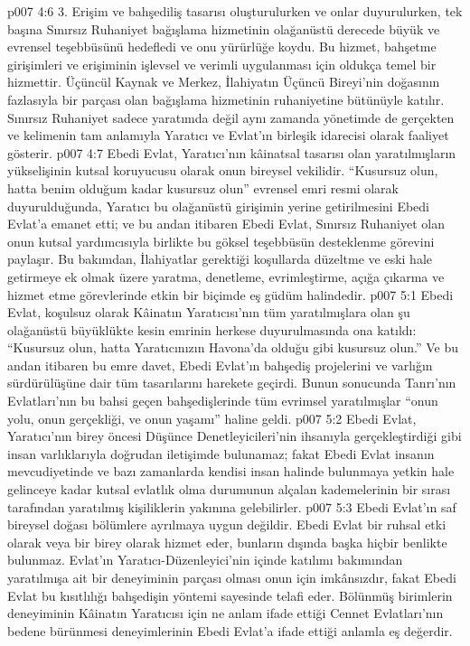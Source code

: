 \vs p007 4:6 3.\bibnobreakspace {} Erişim ve bahşediliş tasarısı oluşturulurken ve onlar duyurulurken, tek başına Sınırsız Ruhaniyet bağışlama hizmetinin olağanüstü derecede büyük ve evrensel teşebbüsünü hedefledi ve onu yürürlüğe koydu. Bu hizmet, bahşetme girişimleri ve erişiminin işlevsel ve verimli uygulanması için oldukça temel bir hizmettir. Üçüncül Kaynak ve Merkez, İlahiyatın Üçüncü Bireyi’nin doğasının fazlasıyla bir parçası olan bağışlama hizmetinin ruhaniyetine bütünüyle katılır. Sınırsız Ruhaniyet sadece yaratımda değil aynı zamanda yönetimde de gerçekten ve kelimenin tam anlamıyla Yaratıcı ve Evlat’ın birleşik idarecisi olarak faaliyet gösterir.
\vs p007 4:7 Ebedi Evlat, Yaratıcı’nın kâinatsal tasarısı olan yaratılmışların yükselişinin kutsal koruyucusu olarak onun bireysel vekilidir. “Kusursuz olun, hatta benim olduğum kadar kusursuz olun” evrensel emri resmi olarak duyurulduğunda, Yaratıcı bu olağanüstü girişimin yerine getirilmesini Ebedi Evlat’a emanet etti; ve bu andan itibaren Ebedi Evlat, Sınırsız Ruhaniyet olan onun kutsal yardımcısıyla birlikte bu göksel teşebbüsün desteklenme görevini paylaşır. Bu bakımdan, İlahiyatlar gerektiği koşullarda düzeltme ve eski hale getirmeye ek olmak üzere yaratma, denetleme, evrimleştirme, açığa çıkarma ve hizmet etme görevlerinde etkin bir biçimde eş güdüm halindedir.
\vs p007 5:1 Ebedi Evlat, koşulsuz olarak Kâinatın Yaratıcısı’nın tüm yaratılmışlara olan şu olağanüstü büyüklükte kesin emrinin herkese duyurulmasında ona katıldı: “Kusursuz olun, hatta Yaratıcınızın Havona’da olduğu gibi kusursuz olun.” Ve bu andan itibaren bu emre davet, Ebedi Evlat’ın bahşediş projelerini ve varlığın sürdürülüşüne dair tüm tasarılarını harekete geçirdi. Bunun sonucunda Tanrı'nın Evlatları’nın bu bahsi geçen bahşedişlerinde tüm evrimsel yaratılmışlar “onun yolu, onun gerçekliği, ve onun yaşamı” haline geldi.
\vs p007 5:2 Ebedi Evlat, Yaratıcı’nın birey öncesi Düşünce Denetleyicileri’nin ihsanıyla gerçekleştirdiği gibi insan varlıklarıyla doğrudan iletişimde bulunamaz; fakat Ebedi Evlat insanın mevcudiyetinde ve bazı zamanlarda kendisi insan halinde bulunmaya yetkin hale gelinceye kadar kutsal evlatlık olma durumunun alçalan kademelerinin bir sırası tarafından yaratılmış kişiliklerin yakınına gelebilirler.
\vs p007 5:3 Ebedi Evlat’ın saf bireysel doğası bölümlere ayrılmaya uygun değildir. Ebedi Evlat bir ruhsal etki olarak veya bir birey olarak hizmet eder, bunların dışında başka hiçbir benlikte bulunmaz. Evlat’ın Yaratıcı\hyp{}Düzenleyici’nin içinde katılımı bakımından yaratılmışa ait bir deneyiminin parçası olması onun için imkânsızdır, fakat Ebedi Evlat bu kısıtlılığı bahşedişin yöntemi sayesinde telafi eder. Bölünmüş birimlerin deneyiminin Kâinatın Yaratıcısı için ne anlam ifade ettiği Cennet Evlatları’nın bedene bürünmesi deneyimlerinin Ebedi Evlat’a ifade ettiği anlamla eş değerdir.

